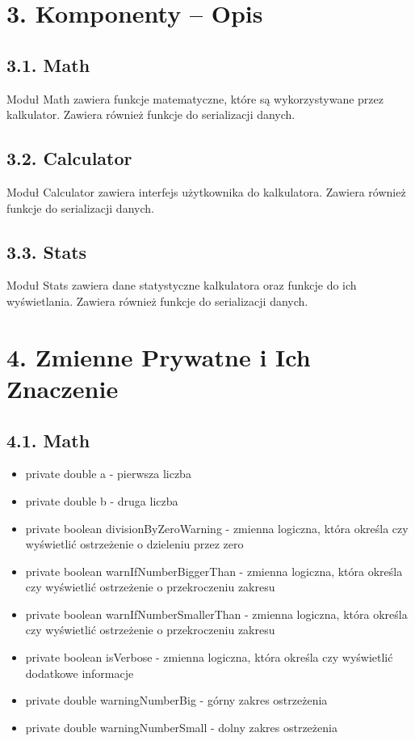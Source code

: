 \documentclass{article}
\begin{document}
\section*{3. Komponenty – Opis}

\subsection*{3.1. Math}

Moduł Math zawiera funkcje matematyczne, które są wykorzystywane przez kalkulator.
Zawiera również funkcje do serializacji danych.

\subsection*{3.2. Calculator}

Moduł Calculator zawiera interfejs użytkownika do kalkulatora.
Zawiera również funkcje do serializacji danych.

\subsection*{3.3. Stats}

Moduł Stats zawiera dane statystyczne kalkulatora oraz funkcje do ich wyświetlania.
Zawiera również funkcje do serializacji danych.

\newpage
\section*{4. Zmienne Prywatne i Ich Znaczenie}

\subsection*{4.1. Math}

\begin{itemize}
    \item private double a - pierwsza liczba
    \item private double b - druga liczba
    \item private boolean divisionByZeroWarning - zmienna logiczna, która określa czy wyświetlić ostrzeżenie o dzieleniu przez zero
    \item private boolean warnIfNumberBiggerThan - zmienna logiczna, która określa czy wyświetlić ostrzeżenie o przekroczeniu zakresu
    \item private boolean warnIfNumberSmallerThan - zmienna logiczna, która określa czy wyświetlić ostrzeżenie o przekroczeniu zakresu
    \item private boolean isVerbose - zmienna logiczna, która określa czy wyświetlić dodatkowe informacje
    \item private double warningNumberBig - górny zakres ostrzeżenia
    \item private double warningNumberSmall - dolny zakres ostrzeżenia
\end{itemize}
\end{document}
